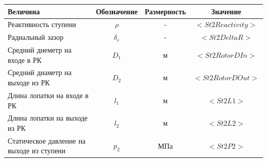 \documentclass[a4paper,10pt]{article}
\begin{document}
\begin{center}
	\begin{tabular}{|p{7cm}|c|c|c|}
		\hline
		\textbf{Величина} & \textbf{Обозначение} & \textbf{Размерность} & \textbf{Значение} \\ \hline
		Реактивность ступени & $\rho$ & - & $<St2Reactivity>$ \\ \hline
		Радиальный зазор & $\delta_r$ & - & $<St2DeltaR>$ \\ \hline
		Средний диеметр на входе в РК & $D_1$ & м & $<St2RotorDIn>$ \\ \hline
		Средний диаметр на выходе из РК & $D_2$ & м & $<St2RotorDOut>$ \\ \hline 
		Длина лопатки на входе в РК & $l_1$ & м & $<St2L1>$ \\ \hline 
		Длина лопатки на выходе из РК & $l_2$ & м & $<St2L2>$ \\ \hline
		Статическое давление на выходе из ступени & $p_2$ & МПа & $<St2P2>$ \\ \hline
				
	\end{tabular}
\end{center}
\end{document}
